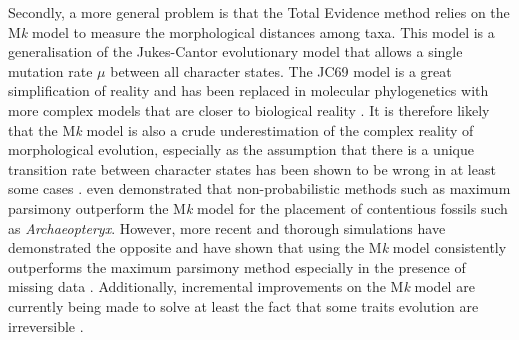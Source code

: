 Secondly, a more general problem is that the Total Evidence method relies on the M\textit{k} model \citep{lewisa2001} to measure the morphological distances among taxa. %
This model is a generalisation of the Jukes-Cantor evolutionary model \citep[JC69;][]{jukes1969evolution} that allows a single mutation rate $\mu$ between all character states.
The JC69 model is a great simplification of reality and has been replaced in molecular phylogenetics with more complex models that are closer to biological reality \citep[e.g. the GTR model that allows a different rate for each different type of nucleotide change;][]{tavare1986}.
It is therefore likely that the M\textit{k} model is also a crude underestimation of the complex reality of morphological evolution, especially as the assumption that there is a unique transition rate between character states has been shown to be wrong in at least some cases \citep[e.g. for Dollo traits that are irreversible;][]{WrightDollo}.
\cite{spencerefficacy2013} even demonstrated that non-probabilistic methods such as maximum parsimony outperform the M\textit{k} model for the placement of contentious fossils such as \textit{Archaeopteryx}.
However, more recent and thorough simulations have demonstrated the opposite and have shown that using the M\textit{k} model consistently outperforms the maximum parsimony method %
especially in the presence of missing data \citep{wrightbayesian2014}.
Additionally, incremental improvements on the M\textit{k} model are currently being made to solve at least the fact that some traits evolution are irreversible \citep[][and personal communications]{Klopfstein12082015}.

